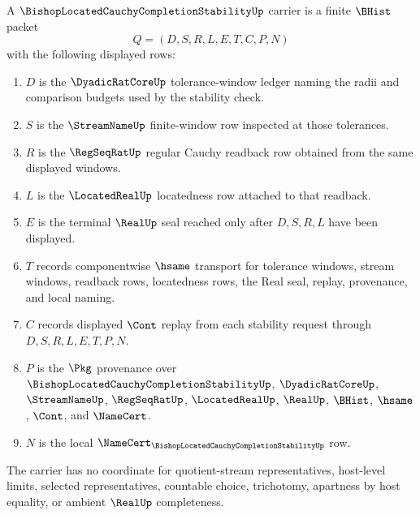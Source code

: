 \begin{definition}
\label{def:bishop-located-cauchy-completion-stability-carrier}
A $\BishopLocatedCauchyCompletionStabilityUp$ carrier is a finite $\BHist$ packet
$$
Q=(D,S,R,L,E,T,C,P,N)
$$
with the following displayed rows:
\begin{enumerate}
\item $D$ is the $\DyadicRatCoreUp$ tolerance-window ledger naming the radii and comparison budgets used by the stability check.
\item $S$ is the $\StreamNameUp$ finite-window row inspected at those tolerances.
\item $R$ is the $\RegSeqRatUp$ regular Cauchy readback row obtained from the same displayed windows.
\item $L$ is the $\LocatedRealUp$ locatedness row attached to that readback.
\item $E$ is the terminal $\RealUp$ seal reached only after $D,S,R,L$ have been displayed.
\item $T$ records componentwise $\hsame$ transport for tolerance windows, stream windows, readback rows, locatedness rows, the Real seal, replay, provenance, and local naming.
\item $C$ records displayed $\Cont$ replay from each stability request through $D,S,R,L,E,T,P,N$.
\item $P$ is the $\Pkg$ provenance over $\BishopLocatedCauchyCompletionStabilityUp$, $\DyadicRatCoreUp$, $\StreamNameUp$, $\RegSeqRatUp$, $\LocatedRealUp$, $\RealUp$, $\BHist$, $\hsame$, $\Cont$, and $\NameCert$.
\item $N$ is the local $\NameCert_{\BishopLocatedCauchyCompletionStabilityUp}$ row.
\end{enumerate}
The carrier has no coordinate for quotient-stream representatives, host-level limits, selected representatives, countable choice, trichotomy, apartness by host equality, or ambient $\RealUp$ completeness.
\end{definition}

